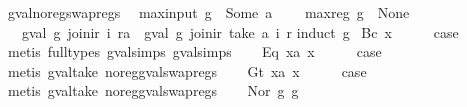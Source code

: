 \begin{isabellebody}
%
\endisatagproof
{\isafoldproof}%
%
\isadelimproof
\isanewline
%
\endisadelimproof
\isanewline
{}\isamarkupfalse%
\ gval{\isacharunderscore}no{\isacharunderscore}reg{\isacharunderscore}swap{\isacharunderscore}regs{\isacharcolon}\isanewline
\ \ {\isachardoublequoteopen}max{\isacharunderscore}input\ g\ {\isacharless}\ Some\ a\ {\isasymLongrightarrow}\isanewline
\ \ \ max{\isacharunderscore}reg\ g\ {\isacharequal}\ None\ {\isasymLongrightarrow}\isanewline
\ \ \ gval\ g\ {\isacharparenleft}join{\isacharunderscore}ir\ i\ ra{\isacharparenright}\ {\isacharequal}\ gval\ g\ {\isacharparenleft}join{\isacharunderscore}ir\ {\isacharparenleft}take\ a\ i{\isacharparenright}\ r{\isacharparenright}{\isachardoublequoteclose}\isanewline
%
\isadelimproof
%
\endisadelimproof
%
\isatagproof
{}\isamarkupfalse%
{\isacharparenleft}induct\ g{\isacharparenright}\isanewline
{}\isamarkupfalse%
\ {\isacharparenleft}Bc\ x{\isacharparenright}\isanewline
\ \ \isamarkupfalse%
\ \isamarkupfalse%
\ {\isacharquery}case\isanewline
\ \ \ \ \isamarkupfalse%
\ {\isacharparenleft}metis\ {\isacharparenleft}full{\isacharunderscore}types{\isacharparenright}\ gval{\isachardot}simps{\isacharparenleft}{}{\isacharparenright}\ gval{\isachardot}simps{\isacharparenleft}{}{\isacharparenright}{\isacharparenright}\isanewline
{}\isamarkupfalse%
\isanewline
\ \ \isamarkupfalse%
\ {\isacharparenleft}Eq\ x{}a\ x{}{\isacharparenright}\isanewline
\ \ \isamarkupfalse%
\ \isamarkupfalse%
\ {\isacharquery}case\isanewline
\ \ \ \ \isamarkupfalse%
\ {\isacharparenleft}metis\ gval{\isacharunderscore}take\ no{\isacharunderscore}reg{\isacharunderscore}gval{\isacharunderscore}swap{\isacharunderscore}regs{\isacharparenright}\isanewline
{}\isamarkupfalse%
\isanewline
\ \ \isamarkupfalse%
\ {\isacharparenleft}Gt\ x{}a\ x{}{\isacharparenright}\isanewline
\ \ \isamarkupfalse%
\ \isamarkupfalse%
\ {\isacharquery}case\isanewline
\ \ \ \ \isamarkupfalse%
\ {\isacharparenleft}metis\ gval{\isacharunderscore}take\ no{\isacharunderscore}reg{\isacharunderscore}gval{\isacharunderscore}swap{\isacharunderscore}regs{\isacharparenright}\isanewline
{}\isamarkupfalse%
\isanewline
\ \ \isamarkupfalse%
\ {\isacharparenleft}Nor\ g{}\ g{}{\isacharparenright}\isanewline

\end{isabellebody}
